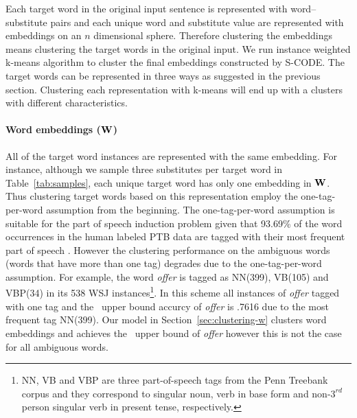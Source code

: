 Each target word in the original input sentence is represented with
word--substitute pairs and each unique word and substitute value are
represented with embeddings on an $n$ dimensional sphere.  Therefore
clustering the embeddings means clustering the target words in the
original input.  We run instance weighted k-means algorithm to cluster
the final embeddings constructed by S-CODE.  The target words can be
represented in three ways as suggested in the previous section.
Clustering each representation with k-means will end up with a
clusters with different characteristics.

\paragraph{Word embeddings (${\bf W}$)} All of the target word
instances are represented with the same embedding.  For instance,
although we sample three substitutes per target word in
Table~\ref{tab:samples}, each unique target word has only one
embedding in ${\bf W}$.  Thus clustering target words based on this
representation employ the one-tag-per-word assumption from the
beginning.  The one-tag-per-word assumption is suitable for the part
of speech induction problem given that 93.69\% of the word occurrences
in the human labeled PTB data are tagged with their most frequent part
of speech \cite{Toutanova:2003:FPT:1073445.1073478}.  However the
clustering performance on the ambiguous words (words that have more
than one tag) degrades due to the one-tag-per-word assumption.  For
example, the word {\it offer} is tagged as NN(399), VB(105) and
VBP(34) in its 538 WSJ instances\footnote{NN, VB and VBP are three
  part-of-speech tags from the Penn Treebank corpus and they
  correspond to singular noun, verb in base form and
  non-$3^{rd}$person singular verb in present tense, respectively.}.
In this scheme all instances of {\it offer} tagged with one tag
and the \mto\ upper bound accurcy of {\it offer} is .7616 due to
the most frequent tag NN(399). Our model in
Section~\ref{sec:clustering-w} clusters word embeddings and achieves
the \mto\ upper bound of {\it offer} however this is not the case
for all ambiguous words.

